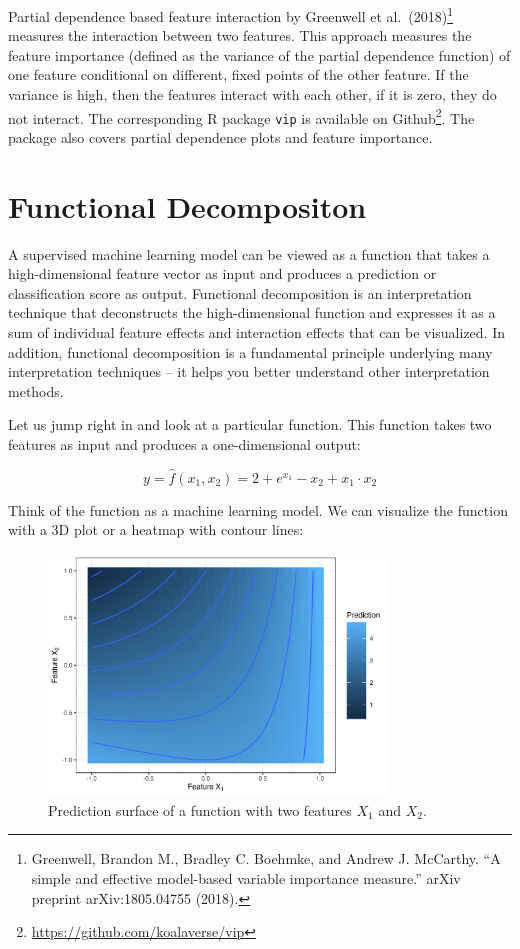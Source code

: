 \documentclass[
  10pt,
]{scrbook}
\renewcommand{\href}[2]{#2\footnote{\url{#1}}}
\begin{document}
Partial dependence based feature interaction by Greenwell et al.~(2018)\footnote{Greenwell, Brandon M., Bradley C. Boehmke, and Andrew J. McCarthy. ``A simple and effective model-based variable importance measure.'' arXiv preprint arXiv:1805.04755 (2018).} measures the interaction between two features.
This approach measures the feature importance (defined as the variance of the partial dependence function) of one feature conditional on different, fixed points of the other feature.
If the variance is high, then the features interact with each other, if it is zero, they do not interact.
The corresponding R package \texttt{vip} is available on \href{https://github.com/koalaverse/vip}{Github}.
The package also covers partial dependence plots and feature importance.

\hypertarget{decomposition}{%
\section{Functional Decompositon}\label{decomposition}}

A supervised machine learning model can be viewed as a function that takes a high-dimensional feature vector as input and produces a prediction or classification score as output.
Functional decomposition is an interpretation technique that deconstructs the high-dimensional function and expresses it as a sum of individual feature effects and interaction effects that can be visualized.
In addition, functional decomposition is a fundamental principle underlying many interpretation techniques -- it helps you better understand other interpretation methods.

Let us jump right in and look at a particular function.
This function takes two features as input and produces a one-dimensional output:

\[y = \hat{f}(x_1, x_2) = 2 + e^{x_1} - x_2 + x_1 \cdot x_2\]

Think of the function as a machine learning model.
We can visualize the function with a 3D plot or a heatmap with contour lines:

\begin{figure}

{\centering \includegraphics[width=0.8\textwidth]{images/unnamed-chunk-16-1} 

}

\caption{Prediction surface of a function with two features $X_1$ and $X_2$.}\label{fig:unnamed-chunk-16}
\end{figure}
\end{document}
